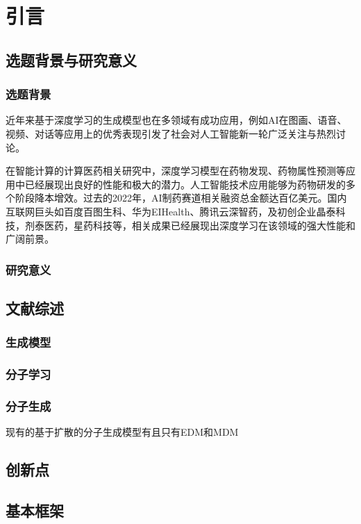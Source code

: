 \mainmatter
\fancyfoot[EC,OC]{\hspace*{1 em}\thepage{}\hspace*{1 em}}
\normalsize
{}
\chapter[引言]{引言}\fancyhead[C]{\xiaowuhao} %
\section{选题背景与研究意义}
\subsection{选题背景}

近年来基于深度学习的生成模型也在多领域有成功应用，例如AI在图画、语音、视频、对话等应用上的优秀表现引发了社会对人工智能新一轮广泛关注与热烈讨论。

在智能计算的计算医药相关研究中，深度学习模型在药物发现、药物属性预测等应用中已经展现出良好的性能和极大的潜力。人工智能技术应用能够为药物研发的多个阶段降本增效。过去的2022年，AI制药赛道相关融资总金额达百亿美元。国内互联网巨头如百度百图生科、华为EIHealth、腾讯云深智药，及初创企业晶泰科技，剂泰医药，星药科技等，相关成果已经展现出深度学习在该领域的强大性能和广阔前景。

\subsection{研究意义}

\section{文献综述}

\subsection{生成模型}

\subsection{分子学习}

\subsection{分子生成}
现有的基于扩散的分子生成模型有且只有EDM\cite{edm_icml_hoogeboom_22}和MDM\cite{mdm_aaai_huang_22}

\section{创新点}

\section{基本框架}